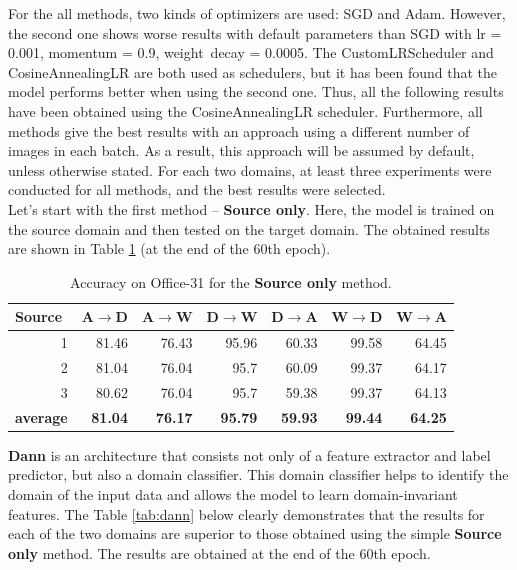 For the all methods, two kinds of optimizers are used: SGD and Adam. However, the second one shows worse results with default parameters than SGD with lr = 0.001, momentum = 0.9, weight~decay = 0.0005. The CustomLRScheduler and CosineAnnealingLR are both used as schedulers, but it has been found that the model performs better when using the second one. Thus, all the following results have been obtained using the CosineAnnealingLR scheduler. Furthermore, all methods give the best results with an approach using a different number of images in each batch. As a result, this approach will be assumed by default, unless otherwise stated. For each two domains, at least three experiments were conducted for all methods, and the best results were selected.\\

Let's start with the first method -- \textbf{Source only}. Here, the model is trained on the source domain and then tested on the target domain. The obtained results are shown in Table \ref{tab:source} (at the end of the 60th epoch).

\begin{table}[h]
\centering
\caption{Accuracy on Office-31 for the \textbf{Source only} method.}
\label{tab:source}
\begin{tabular}{|r|r|r|r|r|r|r|}
\hline
\multicolumn{1}{|l|}{Source} & \multicolumn{1}{l|}{A$\rightarrow$D} & \multicolumn{1}{l|}{A$\rightarrow$W} & \multicolumn{1}{l|}{D$\rightarrow$W} & \multicolumn{1}{l|}{D$\rightarrow$A} & \multicolumn{1}{l|}{W$\rightarrow$D} & \multicolumn{1}{l|}{W$\rightarrow$A} \\ \hline
1 & 81.46 & 76.43 & 95.96 & 60.33 & 99.58 & 64.45 \\ \hline
2 & 81.04 & 76.04 & 95.7 & 60.09 & 99.37 & 64.17 \\ \hline
3 & 80.62 & 76.04 & 95.7 & 59.38 & 99.37 & 64.13 \\ \hline
\multicolumn{1}{|l|}{\textbf{average}} & \textbf{81.04} & \textbf{76.17} & \textbf{95.79} & \textbf{59.93} & \textbf{99.44} & \textbf{64.25} \\ \hline
\end{tabular}
\end{table}

\textbf{Dann} is an architecture that consists not only of a feature extractor and label predictor, but also a domain classifier. This domain classifier helps to identify the domain of the input data and allows the model to learn domain-invariant features. The Table \ref{tab:dann} below clearly demonstrates that the results for each of the two domains are superior to those obtained using the simple \textbf{Source only} method. The results are obtained at the end of the 60th epoch.

